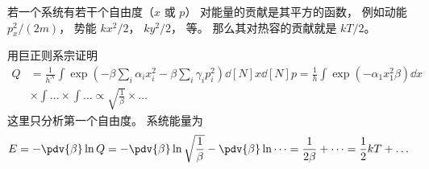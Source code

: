 
若一个系统有若干个自由度（$x$ 或 $p$） 对能量的贡献是其平方的函数， 例如动能 $p_x^2/(2m)$， 势能 $kx^2/2$， $ky^2/2$， 等。 那么其对热容的贡献就是 $kT/2$。

用巨正则系宗证明
\begin{equation}
\begin{aligned}
Q &= \frac{1}{h^N} \int \exp(-\beta \sum_i \alpha_i x_i^2 - \beta \sum_i \gamma_i p_i^2) \dd[N]{x} \dd[N]{p} = \frac{1}{h} \int \exp(-\alpha_1 x_1^2 \beta) \dd{x}\\
& \times \int \dots \times \int \dots \propto \sqrt{\frac{1}{\beta}} \times \dots
\end{aligned}~
\end{equation}
这里只分析第一个自由度。 系统能量为
\begin{equation}
E = -\pdv{\beta} \ln Q = -\pdv{\beta} \ln \sqrt{\frac{1}{\beta}} - \pdv{\beta} \ln \dots = \frac{1}{2\beta} + \dots = \frac{1}{2}kT + \dots~
\end{equation}
